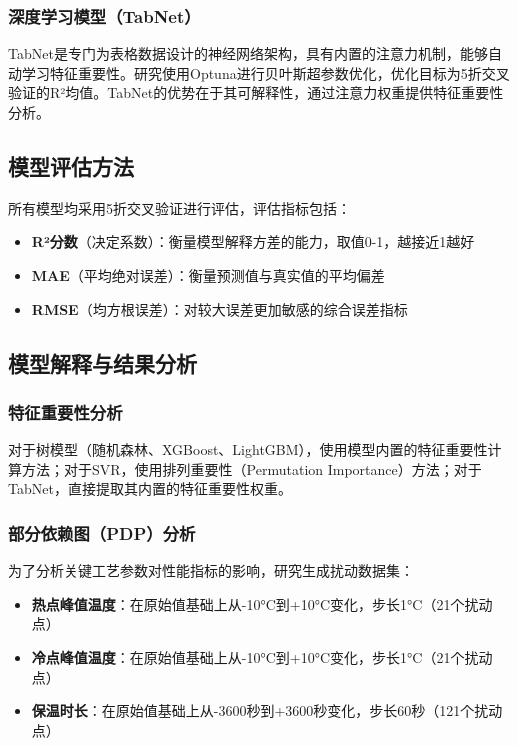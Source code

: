 \documentclass[12pt,a4paper]{article}
\begin{document}
\subsubsection{深度学习模型（TabNet）}

TabNet是专门为表格数据设计的神经网络架构，具有内置的注意力机制，能够自动学习特征重要性。研究使用Optuna进行贝叶斯超参数优化，优化目标为5折交叉验证的R²均值。TabNet的优势在于其可解释性，通过注意力权重提供特征重要性分析。

\subsection{模型评估方法}

所有模型均采用5折交叉验证进行评估，评估指标包括：
\begin{itemize}
\item \textbf{R²分数}（决定系数）：衡量模型解释方差的能力，取值0-1，越接近1越好
\item \textbf{MAE}（平均绝对误差）：衡量预测值与真实值的平均偏差
\item \textbf{RMSE}（均方根误差）：对较大误差更加敏感的综合误差指标
\end{itemize}

\subsection{模型解释与结果分析}

\subsubsection{特征重要性分析}

对于树模型（随机森林、XGBoost、LightGBM），使用模型内置的特征重要性计算方法；对于SVR，使用排列重要性（Permutation Importance）方法；对于TabNet，直接提取其内置的特征重要性权重。

\subsubsection{部分依赖图（PDP）分析}

为了分析关键工艺参数对性能指标的影响，研究生成扰动数据集：
\begin{itemize}
\item \textbf{热点峰值温度}：在原始值基础上从-10°C到+10°C变化，步长1°C（21个扰动点）
\item \textbf{冷点峰值温度}：在原始值基础上从-10°C到+10°C变化，步长1°C（21个扰动点）
\item \textbf{保温时长}：在原始值基础上从-3600秒到+3600秒变化，步长60秒（121个扰动点）
\end{itemize}
\end{document}
